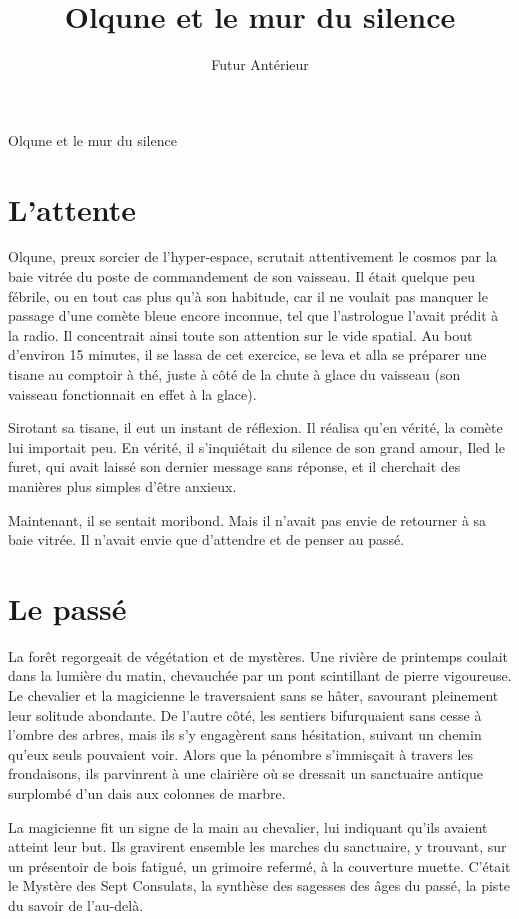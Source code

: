 \documentclass[a4paper,11pt, openany]{book}
\title{Olqune et le mur du silence}
\author{Futur Antérieur}
\date{}
\begin{document}
{\Large Olqune et le mur du silence}

\chapter{L'attente}
Olqune, preux sorcier de l'hyper-espace, scrutait attentivement le cosmos par la baie vitrée du poste de commandement de son vaisseau.
Il était quelque peu fébrile, ou en tout cas plus qu'à son habitude, car il ne voulait pas manquer le passage d'une comète bleue encore inconnue, tel que l'astrologue l'avait prédit à la radio.
Il concentrait ainsi toute son attention sur le vide spatial. Au bout d'environ 15 minutes, il se lassa de cet exercice, se leva 
et alla se préparer une tisane au comptoir à thé, juste à côté de la chute à glace du vaisseau (son vaisseau fonctionnait en effet à la glace).

Sirotant sa tisane, il eut un instant de réflexion. Il réalisa qu'en vérité, la comète lui importait peu.
En vérité, il s'inquiétait du silence de son grand amour, Iled le furet, qui avait laissé son dernier message sans réponse, et il cherchait des manières plus simples d'être anxieux.

Maintenant, il se sentait moribond. Mais il n'avait pas envie de retourner à sa baie vitrée. Il n'avait envie que d'attendre et de penser au passé.

\chapter{Le passé}
La forêt regorgeait de végétation et de mystères. Une rivière de printemps coulait dans la lumière du matin, chevauchée par un pont scintillant de pierre vigoureuse.
Le chevalier et la magicienne le traversaient sans se hâter, savourant pleinement leur solitude abondante. 
De l'autre côté, les sentiers bifurquaient sans cesse à l'ombre des arbres, mais ils s'y engagèrent sans hésitation, suivant un chemin qu'eux seuls pouvaient voir.
Alors que la pénombre s'immisçait à travers les frondaisons, ils parvinrent à une clairière où se dressait un sanctuaire antique surplombé d'un dais aux colonnes de marbre. 

La magicienne fit un signe de la main au chevalier, lui indiquant qu'ils avaient atteint leur but. 
Ils gravirent ensemble les marches du sanctuaire, y trouvant, sur un présentoir de bois fatigué, un grimoire refermé, à la couverture muette.
C'était le Mystère des Sept Consulats, la synthèse des sagesses des âges du passé, la piste du savoir de l'au-delà.
\end{document}
